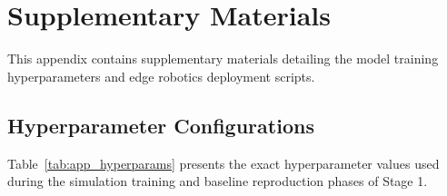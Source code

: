 
\chapter{Supplementary Materials}
\label{app:supplementary}

This appendix contains supplementary materials detailing the model training hyperparameters and edge robotics deployment scripts.

\section{Hyperparameter Configurations}
\label{sec:app_hyperparams}

Table~\ref{tab:app_hyperparams} presents the exact hyperparameter values used during the simulation training and baseline reproduction phases of Stage 1.

